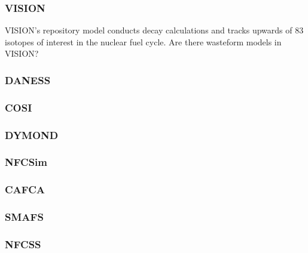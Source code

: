\subsubsection{VISION}
VISION's repository model conducts decay calculations and tracks upwards of 83 isotopes of interest 
in the nuclear fuel cycle. \cite{VISION} Are there wasteform models in VISION?
\subsubsection{DANESS}
\subsubsection{COSI}
\subsubsection{DYMOND}
\subsubsection{NFCSim}
\subsubsection{CAFCA}
\subsubsection{SMAFS}
\subsubsection{NFCSS}
